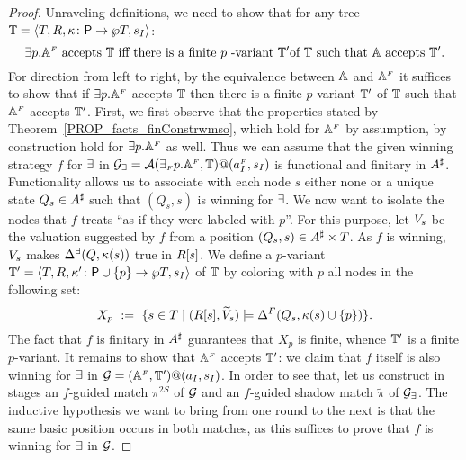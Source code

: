 \begin{proof}
Unraveling definitions, we need to show that for any tree $\mathbb{T} = \langle{T,R,\kappa\colon \mathsf{P}\to \wp T,s_I}\rangle$:
$${{\exists} p}.\aut^{\fin} \text{ accepts } \bbT \text{ iff } \text{there is a finite }p \text{ -variant }\bbT' \text{of } \bbT \text{  such that } \aut \text{  accepts } \bbT'.$$
For direction from left to right, by the equivalence between $\mathbb{A}$ and $\mathbb{A}^{{\scriptscriptstyle F}}$ it suffices to show that if ${{\exists} p}.\mathbb{A}^{{\scriptscriptstyle F}}$ accepts $\mathbb{T}$ then there is a finite $p$-variant $\mathbb{T}'$ of $\mathbb{T}$ such that $\mathbb{A}^{{\scriptscriptstyle F}}$ accepts $\mathbb{T}'$. First, we first observe that the properties stated by Theorem~\ref{PROP_facts_finConstrwmso}, which hold for $\mathbb{A}^{{\scriptscriptstyle F}}$ by assumption, by construction hold for ${{\exists} p}.\mathbb{A}^{{\scriptscriptstyle F}}$ as well. Thus we can assume that the given winning strategy $f$ for $\exists$ in $\mathcal{G_{\exists}} = \mathcal{A}({\exists_{{\scriptscriptstyle F}} p}.\mathbb{A}^{{\scriptscriptstyle F}},\mathbb{T})@(a_I^{{\scriptscriptstyle F}},s_I)$ is functional and finitary in $A^{\sharp}$. Functionality allows us to associate with each node $s$ either none or a unique state $Q_s \in A^{\sharp}$ such that $(Q_s,s)$ is winning for $\exists$. We now want to isolate the nodes that $f$ treats ``as if they were labeled with $p$''. For this purpose, let $V_{s}$ be the valuation suggested by $f$ from a position $(Q_s,s) \in A^{\sharp} \times T$. As $f$ is winning, $V_{s}$ makes $\Delta^\exists(Q,\kappa(s))$ true in $R[s]$. We define a $p$-variant $\mathbb{T}' = \langle{T,R,\kappa' \colon \mathsf{P}\cup\{p\} \to \wp T,s_I}\rangle$ of $\mathbb{T}$ by coloring with $p$ all nodes in the following set:
 \begin{equation}\label{eq:X_p}
   X_p\ :=\ \{s \in T\mid (\R{s},\widetilde{\val}_{s}) \models \tmap^{\f}(Q_s,\tscolors(s)\cup\{p\})\}.
\end{equation}
The fact that $f$ is finitary in $A^{\sharp}$ guarantees that $X_p$ is finite, whence $\mathbb{T}'$ is a finite $p$-variant. It remains to show that $\mathbb{A}^{{\scriptscriptstyle F}}$ accepts $\mathbb{T}'$: we claim that $f$ itself is also winning for $\exists$ in $\mathcal{G} = (\mathbb{A}^{{\scriptscriptstyle F}},\mathbb{T}')@(a_I,s_I)$. In order to see that, let us construct in stages an $f$-guided match $\pi^{2S}$ of $\mathcal{G}$ and an $f$-guided shadow match $\tilde{\pi}$ of $\mathcal{G_{\exists}}$. The inductive hypothesis we want to bring from one round to the next is that the same basic position occurs in both matches, as this suffices to prove that $f$ is winning for $\exists$ in $\mathcal{G}$.


\end{proof}

